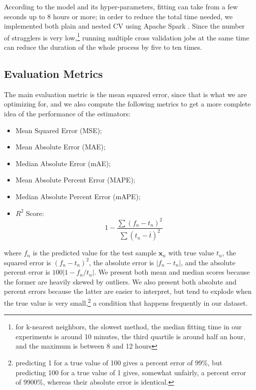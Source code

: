 \documentclass[a4paper,11pt]{kth-mag}
\begin{document}
According to the model and its hyper-parameters, fitting can take from a few seconds up to 8 hours or more; in order to reduce the total time needed, we implemented both plain and nested CV using Apache Spark \citep{spark}. Since the number of stragglers is very low,\footnote{for k-nearest neighbors, the slowest method, the median fitting time in our experiments is around 10 minutes, the third quartile is around half an hour, and the maximum is between 8 and 12 hours} running multiple cross validation jobs at the same time can reduce the duration of the whole process by five to ten times.

\subsection{Evaluation Metrics}
The main evaluation metric is the mean squared error, since that is what we are optimizing for, and we also compute the following metrics to get a more complete idea of the performance of the estimators:

\begin{itemize}
\item Mean Squared Error (MSE);
\item Mean Absolute Error (MAE);
\item Median Absolute Error (mAE);
\item Mean Absolute Percent Error (MAPE);
\item Median Absolute Percent Error (mAPE);
\item $R^2$ Score:
$$
1-\frac{\sum (f_n-t_n)^2}{\sum (t_n-\overline{t})^2}
$$
\end{itemize}

\noindent where $f_n$ is the predicted value for the test sample $\bm x_n$ with true value $t_n$, the squared error is $(f_n-t_n)^2$, the absolute error is $\vert f_n-t_n\vert$, and the absolute percent error is $100\vert 1-f_n/t_n\vert$. We present both mean and median scores because the former are heavily skewed by outliers. We also present both absolute and percent errors because the latter are easier to interpret, but tend to explode when the true value is very small,\footnote{predicting 1 for a true value of 100 gives a percent error of 99\%, but predicting 100 for a true value of 1 gives, somewhat unfairly, a percent error of 9900\%, whereas their absolute error is identical.} a condition that happens frequently in our dataset.
\end{document}

